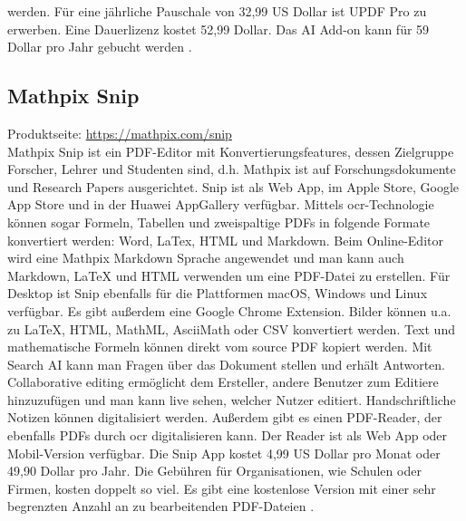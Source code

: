 werden. Für eine jährliche Pauschale von 32,99 US Dollar ist UPDF Pro zu erwerben. Eine Dauerlizenz kostet 52,99 Dollar. Das AI Add-on kann für 59 Dollar pro Jahr gebucht werden \cite{updf-um}. 

\subsection{Mathpix Snip}
Produktseite: \url{https://mathpix.com/snip} \\
Mathpix Snip ist ein PDF-Editor mit Konvertierungsfeatures, dessen Zielgruppe Forscher, Lehrer und Studenten sind, d.h. Mathpix ist auf Forschungsdokumente und Research Papers ausgerichtet. Snip ist als Web App, im Apple Store, Google App Store und in der Huawei AppGallery verfügbar. Mittels \gls{ocr}-Technologie können sogar Formeln, Tabellen und zweispaltige PDFs in folgende Formate konvertiert werden: Word, LaTex, HTML und Markdown. Beim Online-Editor wird eine Mathpix Markdown Sprache angewendet
und man kann auch Markdown, LaTeX und HTML verwenden um eine PDF-Datei zu erstellen. Für Desktop ist Snip ebenfalls für die Plattformen macOS, Windows und Linux verfügbar. Es gibt außerdem eine Google Chrome Extension. Bilder können u.a. zu LaTeX, HTML, MathML, AsciiMath oder CSV konvertiert werden. Text und mathematische Formeln können direkt vom source PDF kopiert werden. Mit Search AI kann man Fragen über das Dokument stellen und erhält Antworten. Collaborative editing ermöglicht dem Ersteller, andere Benutzer zum Editiere hinzuzufügen und man kann live sehen, welcher Nutzer editiert. Handschriftliche Notizen können digitalisiert werden. Außerdem gibt es einen PDF-Reader, der ebenfalls PDFs durch \gls{ocr} digitalisieren kann. Der Reader ist als Web App oder Mobil-Version verfügbar. Die Snip App kostet 4,99 US Dollar pro Monat oder 49,90 Dollar pro Jahr. Die Gebühren für Organisationen, wie Schulen oder Firmen, kosten doppelt so viel. Es gibt eine kostenlose Version mit einer sehr begrenzten Anzahl an zu bearbeitenden PDF-Dateien \cite{snip-um}.